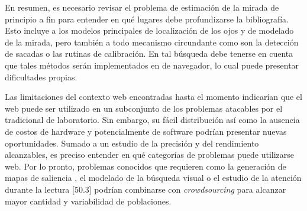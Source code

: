 En resumen, es necesario revisar el problema de estimación de la mirada de
principio a fin para entender en qué lugares debe profundizarse la
bibliografía.
Esto incluye a los modelos principales de localización de los ojos y de
modelado de la mirada, pero también a todo mecanismo circundante como son la
detección de sacadas o las rutinas de calibración.
En tal búsqueda debe tenerse en cuenta que tales métodos serán implementados en
\js de navegador, lo cual puede presentar dificultades propias.

Las limitaciones del contexto web encontradas hasta el momento indicarían que
el \eyetracking web puede ser utilizado en un subconjunto de los problemas
atacables por el \eyetracking tradicional de laboratorio.
Sin embargo, su fácil distribución así como la ausencia de costos de hardware y
potencialmente de software podrían presentar nuevas oportunidades.
Sumado a un estudio de la precisión y del rendimiento alcanzables, es preciso
entender en qué categorías de problemas puede utilizarse \eyetracking web.
Por lo pronto, problemas conocidos que requieren \eyetracking como la
generación de mapas de saliencia \cite{xu_2015_turker_gaze}, el modelado de la
búsqueda visual \cite{clifton_2016_eye_movements_in_reading} o el estudio de la
atención durante la lectura [50.3] podrían combinarse con
\textit{crowdsourcing} para alcanzar mayor cantidad y variabilidad de
poblaciones.
